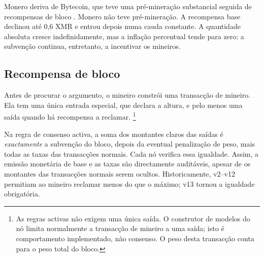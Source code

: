 Monero deriva de Bytecoin, que teve uma pré-mineração substancial seguida de
recompensas de bloco \cite{monero-history}. Monero não teve pré-mineração. A
recompensa base declinou até 0,6 XMR e entrou depois numa cauda constante. A
quantidade absoluta cresce indefinidamente, mas a inflação percentual tende
para zero; a subvenção continua, entretanto, a incentivar os mineiros.
\subsection{Recompensa de bloco}
\label{subsec:block-reward}

Antes de procurar o argumento, o mineiro constrói uma transacção de mineiro.
Ela tem uma única entrada especial, que declara a altura, e pelo menos uma
saída quando há recompensa a reclamar.
\footnote{As regras activas não exigem uma única saída. O construtor de modelos
do nó limita normalmente a transacção de mineiro a uma saída; isto é
comportamento implementado, não consenso. O peso desta transacção conta para o
peso total do bloco.}

Na regra de consenso activa, a soma dos montantes claros das saídas é
\emph{exactamente} a subvenção do bloco, depois da eventual penalização de
peso, mais todas as taxas das transacções normais. Cada nó verifica essa
igualdade. Assim, a emissão monetária de base e as taxas são directamente
auditáveis, apesar de os montantes das transacções normais serem ocultos.
Historicamente, v2--v12 permitiam ao mineiro reclamar menos do que o máximo;
v13 tornou a igualdade obrigatória.


